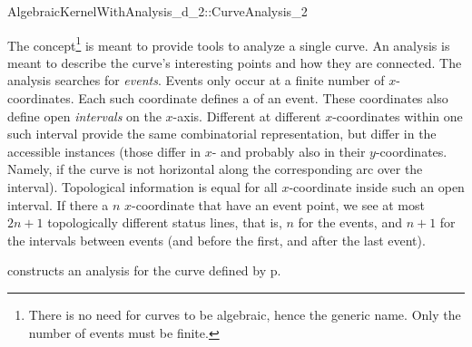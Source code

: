 \begin{ccRefConcept}{AlgebraicKernelWithAnalysis_d_2::CurveAnalysis_2}

\ccDefinition

The 
concept\footnote{There is no need
for curves to be algebraic, hence the generic name. Only the number
of events must be finite.}
 is meant to provide tools to analyze a single
curve. An analysis is meant to describe the curve's interesting points and how 
they are connected. The analysis searches for {\it events}. Events only
occur at a finite number of $x$-coordinates. Each such coordinate defines
a  of an event. These coordinates also define open 
{\it intervals} on the $x$-axis. Different 
 at different $x$-coordinates within one 
such interval provide the same combinatorial representation, but differ
in the accessible  instances (those differ in 
$x$- and probably also in their $y$-coordinates. Namely, if the curve is not
horizontal along the corresponding arc over the interval). 
Topological information is equal for all $x$-coordinate inside such an
open interval. If there a $n$ $x$-coordinate that have an event point, we 
see at most $2n+1$ topologically different status lines, that is, $n$ for 
the events, and $n+1$ for the intervals between events (and before the 
first, and after the last event).


\ccTypes






\ccCreation
{}
        
    {constructs an analysis for the curve defined by p. 
}


\end{ccRefConcept}
